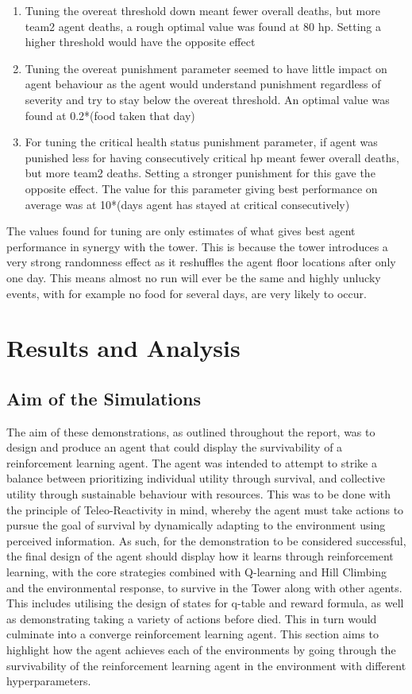 \begin{enumerate}
	\item Tuning the overeat threshold down meant fewer overall deaths, but more team2 agent deaths, a rough optimal value was found at 80 hp. Setting a higher threshold would have the opposite effect
	\item Tuning the overeat punishment parameter seemed to have little impact on agent behaviour as the agent would understand punishment regardless of severity and try to stay below the overeat threshold. An optimal value was found at 0.2*(food taken that day)
	\item For tuning the critical health status punishment parameter, if agent was punished less for having consecutively critical hp meant fewer overall deaths, but more team2 deaths. Setting a stronger punishment for this gave the opposite effect. The value for this parameter giving best performance on average was at 10*(days agent has stayed at critical consecutively)
\end{enumerate}

The values found for tuning are only estimates of what gives best agent performance in synergy with the tower. This is because the tower introduces a very strong randomness effect as it reshuffles the agent floor locations after only one day. This means almost no run will ever be the same and highly unlucky events, with for example no food for several days, are very likely to occur. 

\section{Results and Analysis}
\subsection{Aim of the Simulations}
The aim of these demonstrations, as outlined throughout the report, was to design and produce an agent that could display the survivability of a reinforcement learning agent. The agent was intended to attempt to strike a balance between prioritizing individual utility through survival, and collective utility through sustainable behaviour with resources. This was to be done with the principle of Teleo-Reactivity in mind, whereby the agent must take actions to pursue the goal of survival by dynamically adapting to the environment using perceived information. As such, for the demonstration to be considered successful, the final design of the agent should display how it learns through reinforcement learning, with the core strategies combined with Q-learning and Hill Climbing and the environmental response, to survive in the Tower along with other agents. This includes utilising the design of states for q-table and reward formula, as well as demonstrating taking a variety of actions before died. This in turn would culminate into a converge reinforcement learning agent. This section aims to highlight how the agent achieves each of the environments by going through the survivability of the reinforcement learning agent in the environment with different hyperparameters. 

